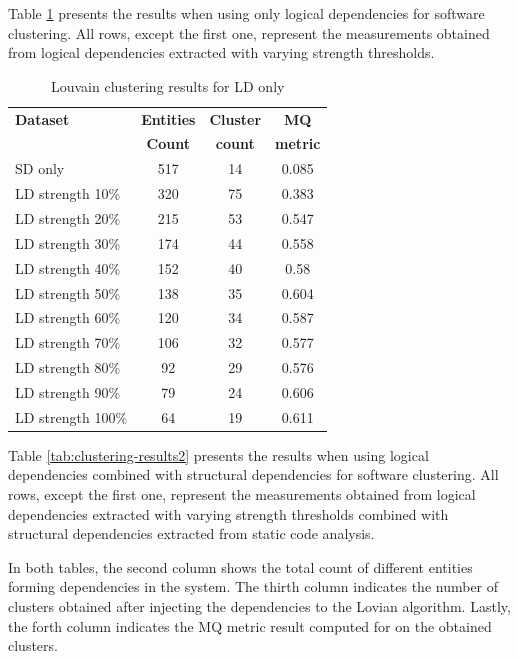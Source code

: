 \documentclass[conference]{IEEEtran}
\begin{document}
Table \ref{tab:clustering-results1} presents the results when using only logical dependencies for software clustering. All rows, except the first one, represent the measurements obtained from logical dependencies extracted with varying strength thresholds.







\begin{table}[htbp]
  \centering
  \caption{Louvain clustering results for LD only}
  \label{tab:clustering-results1}
  \begin{tabular}{lc|c|c}
    \toprule
    \textbf{Dataset} & \textbf{Entities} & \textbf{Cluster} & \textbf{MQ } \\
    & \textbf{Count} & \textbf{count} &  \textbf{metric} \\
    \midrule
    SD only & 517 & 14 &  0.085  \\
    \midrule
LD  strength    10\%    &   320 &   75  &   0.383   \\
LD  strength    20\%    &   215 &   53  &   0.547   \\
LD  strength    30\%    &   174 &   44  &   0.558   \\
LD  strength    40\%    &   152 &   40  &   0.58    \\
LD  strength    50\%    &   138 &   35  &   0.604   \\
LD  strength    60\%    &   120 &   34  &   0.587   \\
LD  strength    70\%    &   106 &   32  &   0.577   \\
LD  strength    80\%    &   92  &   29  &   0.576   \\
LD  strength    90\%    &   79  &   24  &   0.606   \\
LD  strength    100\%   &   64  &   19  &   0.611   \\
    \bottomrule
  \end{tabular}
\end{table}


Table \ref{tab:clustering-results2} presents the results when using logical dependencies combined with structural dependencies for software clustering. All rows, except the first one, represent the measurements obtained from logical dependencies extracted with varying strength thresholds combined with structural dependencies extracted from static code analysis.

In both tables, the second column shows the total count of different entities forming dependencies in the system. The thirth column indicates the number of clusters obtained after injecting the dependencies to the Lovian algorithm. Lastly, the forth column indicates the MQ metric result computed for on the obtained clusters.
\end{document}
